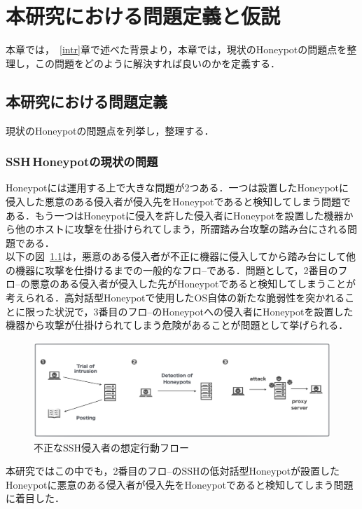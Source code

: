 \chapter{本研究における問題定義と仮説}
\label{appr}

本章では，~\ref{intr}章で述べた背景より，本章では，現状のHoneypotの問題点を整理し，この問題をどのように解決すれば良いのかを定義する．

\section{本研究における問題定義}
\label{appr:problem}
現状のHoneypotの問題点を列挙し，整理する．

\subsection{SSH\,Honeypotの現状の問題}
\label{appr:problemofSshHoneypot}
Honeypotには運用する上で大きな問題が2つある．一つは設置したHoneypotに侵入した悪意のある侵入者が侵入先をHoneypotであると検知してしまう問題である．もう一つはHoneypotに侵入を許した侵入者にHoneypotを設置した機器から他のホストに攻撃を仕掛けられてしまう，所謂踏み台攻撃の踏み台にされる問題である．\\
以下の図~\ref{fig:flow}は，悪意のある侵入者が不正に機器に侵入してから踏み台にして他の機器に攻撃を仕掛けるまでの一般的なフロ--である．問題として，2番目のフロ--の悪意のある侵入者が侵入した先がHoneypotであると検知してしまうことが考えられる．高対話型Honeypotで使用したOS自体の新たな脆弱性を突かれることに限った状況で，3番目のフロ--のHoneypotへの侵入者にHoneypotを設置した機器から攻撃が仕掛けられてしまう危険があることが問題として挙げられる．

\vspace{10mm}
\begin{figure}[H]
    \centering
    \includegraphics[width=1.0\textwidth]{figures/nagare.png}
    \caption{不正なSSH侵入者の想定行動フロー}
    \label{fig:flow}
\end{figure}

本研究ではこの中でも，2番目のフロ--のSSHの低対話型Honeypotが設置したHoneypotに悪意のある侵入者が侵入先をHoneypotであると検知してしまう問題に着目した．

